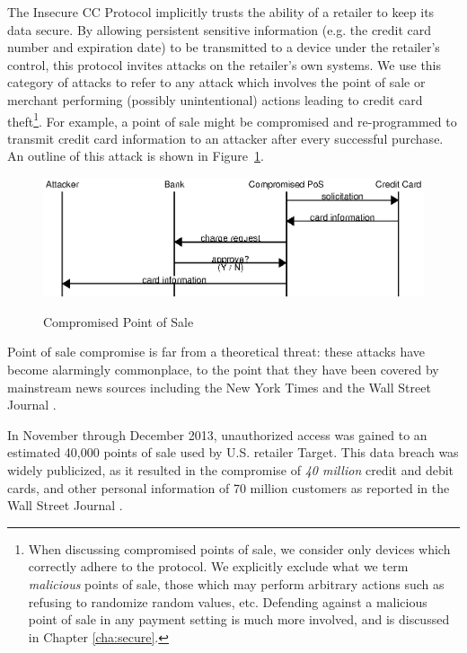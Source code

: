 The Insecure CC Protocol implicitly trusts the ability of a retailer to keep its data secure.
By allowing persistent sensitive information (e.g. the credit card number and expiration date) to be transmitted to a device under the retailer's control,
  this protocol invites attacks on the retailer's own systems.
We use this category of attacks to refer to any attack which involves the point of sale or merchant performing (possibly unintentional) actions leading to credit card theft\footnote{
	When discussing compromised points of sale, we consider only devices which correctly adhere to the protocol.
	We explicitly exclude what we term \emph{malicious} points of sale, those which may perform arbitrary actions such as refusing to randomize random values, etc.
	Defending against a malicious point of sale in any payment setting is much more involved, and is discussed in Chapter \ref{cha:secure}.
}.
For example, a point of sale might be compromised and re-programmed to transmit credit card information to an attacker after every successful purchase.
An outline of this attack is shown in Figure~\ref{fig:insecure-compromised}.

\begin{figure}[h!]
  \caption{Compromised Point of Sale}
  \centering
    \includegraphics{img/attack-3-comppos.eps}
  \label{fig:insecure-compromised}
\end{figure}

Point of sale compromise is far from a theoretical threat:
these attacks have become alarmingly commonplace, to the point that they have been covered by mainstream news sources including the New York Times \cite{neimanmarcushack} and the Wall Street Journal \cite{targethack}\cite{homedepothack}.

In November through December 2013, unauthorized access was gained to an estimated 40,000 points of sale used by U.S. retailer Target.
This data breach was widely publicized, as it resulted in the compromise of \emph{40 million} credit and debit cards, and other personal information of 70 million customers as reported in the Wall Street Journal \cite{targethack}.

